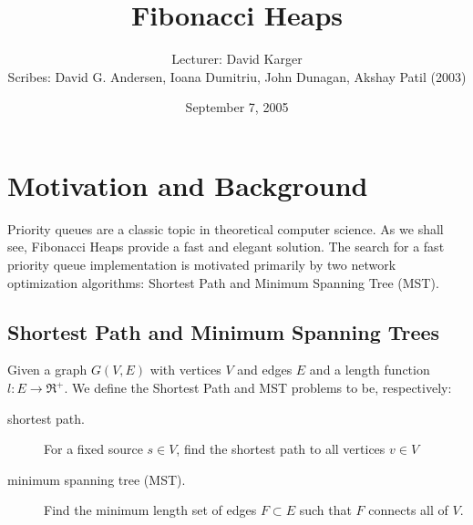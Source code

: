 \documentclass{article}
\title{Fibonacci Heaps}
\date{September 7, 2005}
\author{Lecturer: David Karger\\ Scribes: David G. Andersen,  Ioana Dumitriu, John Dunagan, Akshay Patil (2003)}
\begin{document}
%
%
%
%

%



\section{Motivation and Background}

Priority queues are a classic topic in theoretical computer
science. As we shall see, Fibonacci Heaps provide a fast and  elegant
solution. The
search for a fast priority queue implementation is motivated
primarily by two network optimization algorithms: Shortest Path and
Minimum Spanning Tree (MST).

\subsection{Shortest Path and Minimum Spanning Trees}

Given a graph $G (V,E)$ with vertices $V$ and edges $E$ and a length
function $l: E \rightarrow \Re^+$. We define the Shortest Path and MST
problems to be, respectively:
\begin{description}
\item[shortest path.]  For a fixed source $s \in V$, find the shortest
  path to all vertices $v \in V$
\item[minimum spanning tree (MST).]  Find the minimum length set of
  edges $F \subset E$ such that $F$ connects all of $V$.
\end{description}
\end{document}
